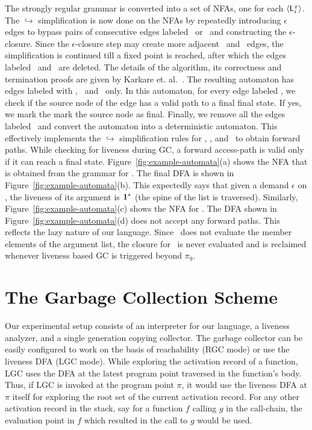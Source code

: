 \documentclass[9pt]{sigplanconf}
\begin{document}
The strongly regular grammar is converted  into a set of NFAs, one for
each $\langle \mathsf{L}_{{i}}^{x}\rangle$.  The $\hookrightarrow$ simplification is now
done on the NFAs by  repeatedly introducing $\epsilon$ edges to bypass
pairs  of consecutive  edges labeled  \bcar\acar\ or  \bcdr\acdr\ and
constructing the $\epsilon$-closure. Since the $\epsilon$-closure step
may  create  more  adjacent  \bcar\acar\ and  \bcdr\acdr\  edges,  the
simplification is continued till a fixed point is reached, after which
the edges labeled \bcar \ and  \bcdr\ are deleted.  The details of the
algorithm, its correctness and termination proofs are given by Karkare
et.  al.~\cite{karkare07liveness,asati14lgc}.  The resulting automaton
has  edges labeled  with  \acar,  \acdr\ and  \clazy\  only. In  this
automaton, for every edge labeled \clazy, we check if the source node
of the edge has a valid path to  a final final state.  If yes, we mark
the mark  the source node as  final. Finally, we remove  all the edges
labeled  \clazy\  and  convert  the automaton  into  a  deterministic
automaton.    This   effectively  implements   the   $\hookrightarrow$
simplification rules for  \bcar, \bcdr, and \clazy\  to obtain forward
paths. While  checking for liveness  during GC, a  forward access-path
is valid only if it can reach a final state.
Figure~\ref{fig:example-automata}(a)  shows the  NFA that  is obtained
from the grammar for .  The final DFA is shown in
Figure~\ref{fig:example-automata}(b).  This expectedly says that given
a  demand $\epsilon$  on  \length,  the liveness  of  its argument  is
$\mathbf{1}^{*}$  (the  spine  of   the  list  is  traversed).   Similarly,
Figure~\ref{fig:example-automata}(c)     shows     the     NFA     for
.          The         DFA         shown         in
Figure~\ref{fig:example-automata}(d)  does  not   accept  any  forward
paths.   This  reflects  the  lazy  nature  of  our  language.   Since
\length\ does not  evaluate the member elements of  the argument list,
the  closure for  \pa\ is  never evaluated  and is  reclaimed whenever
liveness based GC is triggered beyond $\pi_9$.


\section{The Garbage Collection Scheme}
\label{sec:GC-scheme}
Our experimental setup consists of  an interpreter for our language, a
liveness  analyzer, and  a single  generation copying  collector.  The
garbage collector  can be  easily configured to  work on the  basis of
reachability (RGC  mode) or use  the liveness DFA (LGC  mode).  While
exploring the  activation record of a  function, LGC uses  the DFA at
the latest program  point traversed in the function's  body.  Thus, if
LGC is invoked  at the program point $\pi$, it  would use the liveness
DFA  at  $\pi$ itself  for  exploring the  root  set  of the  current
activation record. For  any other activation record in  the stack, say
for a function ${\mathit f}$  calling ${\mathit g}$ in the call-chain,
the evaluation  point in ${\mathit f}$  which resulted in  the call to
${\mathit g}$ would be used.
\end{document}
